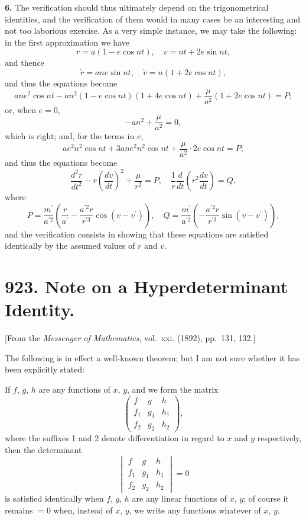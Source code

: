 \documentclass[11pt,a4paper]{book}
\begin{document}
{{{\textbf{6.} The verification should thus ultimately depend on the trigonometrical
identities, and the verification of them would in many cases be an interesting and
not too laborious exercise. As a very simple instance, we may take the following:
in the first approximation we have
\[
r = a(1 - e\cos nt), \quad v = nt + 2e\sin nt,
\]
and thence
\[
\dot{r} = ane\sin nt, \quad \dot{v} = n(1 + 2e\cos nt),
\]
and thus the equations become
\[
ane^2\cos nt - an^2(1 - e\cos nt)(1 + 4e\cos nt) + \frac{\mu}{a^2}(1 + 2e\cos nt) = P;
\]
or, when $e = 0$,
\[
-an^2 + \frac{\mu}{a^2} = 0,
\]
which is right; and, for the terms in $e$,
\[
ae^2n^2\cos nt + 3ane^2n^2\cos nt + \frac{\mu}{a^2}\cdot 2e\cos nt = P;
\]
and thus the equations become
\[
\frac{d^2r}{dt^2} - r\left(\frac{dv}{dt}\right)^2 + \frac{\mu}{r^2} = P, \quad
\frac{1}{r}\frac{d}{dt}\left(r^2\frac{dv}{dt}\right) = Q,
\]
where
\[
P = \frac{m^\prime}{a^{\prime 2}}\left(\frac{r}{a^{\prime}} - \frac{a^{\prime 2}r}{r^{\prime 3}}\cos(v - v^\prime)\right), \quad
Q = \frac{m^\prime}{a^{\prime 2}}\left(-\frac{a^{\prime 2}r}{r^{\prime 3}}\sin(v - v^\prime)\right),
\]
and the verification consists in showing that these equations are satisfied identically
by the assumed values of $r$ and $v$.



\newpage
\section*{923. Note on a Hyperdeterminant Identity.}

[From the \textit{Messenger of Mathematics}, vol.~xxi. (1892), pp.~131, 132.]

\bigskip

The following is in effect a well-known theorem; but I am not sure whether
it has been explicitly stated:

If $f$, $g$, $h$ are any functions of $x$, $y$, and we form the matrix
\[
\begin{pmatrix}
f & g & h\\
f_1 & g_1 & h_1\\
f_2 & g_2 & h_2
\end{pmatrix},
\]
where the suffixes 1 and 2 denote differentiation in regard to $x$ and $y$ respectively,
then the determinant
\[
\begin{vmatrix}
f & g & h\\
f_1 & g_1 & h_1\\
f_2 & g_2 & h_2
\end{vmatrix}
= 0
\]
is satisfied identically when $f$, $g$, $h$ are any linear functions of $x$, $y$; of course it
remains $=0$ when, instead of $x$, $y$, we write any functions whatever of $x$, $y$.

}}}
\end{document}
